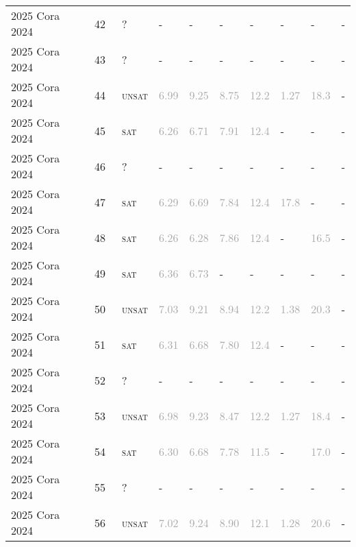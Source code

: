 \begin{center}
{\begin{longtable}{@{}llllllllll@{}}
2025 Cora 2024 & 42 & ~? & - & - & - & - & - & - & - \\
2025 Cora 2024 & 43 & ~? & - & - & - & - & - & - & - \\
2025 Cora 2024 & 44 & ~\textsc{unsat} & \textcolor{darkgray}{6.99} & \textcolor{darkgray}{9.25} & \textcolor{darkgray}{8.75} & \textcolor{darkgray}{12.2} & \textcolor{darkgray}{1.27} & \textcolor{darkgray}{18.3} & - \\
2025 Cora 2024 & 45 & ~\textsc{sat} & \textcolor{darkgray}{6.26} & \textcolor{darkgray}{6.71} & \textcolor{darkgray}{7.91} & \textcolor{darkgray}{12.4} & - & - & - \\
2025 Cora 2024 & 46 & ~? & - & - & - & - & - & - & - \\
2025 Cora 2024 & 47 & ~\textsc{sat} & \textcolor{darkgray}{6.29} & \textcolor{darkgray}{6.69} & \textcolor{darkgray}{7.84} & \textcolor{darkgray}{12.4} & \textcolor{darkgray}{17.8} & - & - \\
2025 Cora 2024 & 48 & ~\textsc{sat} & \textcolor{darkgray}{6.26} & \textcolor{darkgray}{6.28} & \textcolor{darkgray}{7.86} & \textcolor{darkgray}{12.4} & - & \textcolor{darkgray}{16.5} & - \\
2025 Cora 2024 & 49 & ~\textsc{sat} & \textcolor{darkgray}{6.36} & \textcolor{darkgray}{6.73} & - & - & - & - & - \\
2025 Cora 2024 & 50 & ~\textsc{unsat} & \textcolor{darkgray}{7.03} & \textcolor{darkgray}{9.21} & \textcolor{darkgray}{8.94} & \textcolor{darkgray}{12.2} & \textcolor{darkgray}{1.38} & \textcolor{darkgray}{20.3} & - \\
2025 Cora 2024 & 51 & ~\textsc{sat} & \textcolor{darkgray}{6.31} & \textcolor{darkgray}{6.68} & \textcolor{darkgray}{7.80} & \textcolor{darkgray}{12.4} & - & - & - \\
2025 Cora 2024 & 52 & ~? & - & - & - & - & - & - & - \\
2025 Cora 2024 & 53 & ~\textsc{unsat} & \textcolor{darkgray}{6.98} & \textcolor{darkgray}{9.23} & \textcolor{darkgray}{8.47} & \textcolor{darkgray}{12.2} & \textcolor{darkgray}{1.27} & \textcolor{darkgray}{18.4} & - \\
2025 Cora 2024 & 54 & ~\textsc{sat} & \textcolor{darkgray}{6.30} & \textcolor{darkgray}{6.68} & \textcolor{darkgray}{7.78} & \textcolor{darkgray}{11.5} & - & \textcolor{darkgray}{17.0} & - \\
2025 Cora 2024 & 55 & ~? & - & - & - & - & - & - & - \\
2025 Cora 2024 & 56 & ~\textsc{unsat} & \textcolor{darkgray}{7.02} & \textcolor{darkgray}{9.24} & \textcolor{darkgray}{8.90} & \textcolor{darkgray}{12.1} & \textcolor{darkgray}{1.28} & \textcolor{darkgray}{20.6} & - \\

\end{longtable}}
\end{center}
